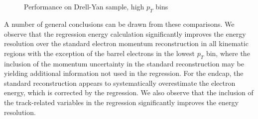 \documentclass{cmspaper}
\begin{document}
\begin{figure}[h]
\centering
		 \\
		 \\
		\caption{Performance on Drell-Yan sample, high $p_T$ bins}
		\label{fig:drellyanEnergyResponse3}
\end{figure}


A number of general conclusions can be drawn from these comparisons. We observe that the regression energy calculation
significantly improves the energy resolution over the standard electron momentum reconstruction in all kinematic
regions with the exception of the barrel electrons in the lowest $p_{T}$ bin, where the inclusion of the momentum
uncertainty in the standard reconstruction may be yielding additional information not used in the regression. 
For the endcap, the standard reconstruction appears to systematically overestimate the electron energy, which
is corrected by the regression. We also observe that the inclusion of the
track-related variables in the regression significantly improves the energy resolution. 
\end{document}
